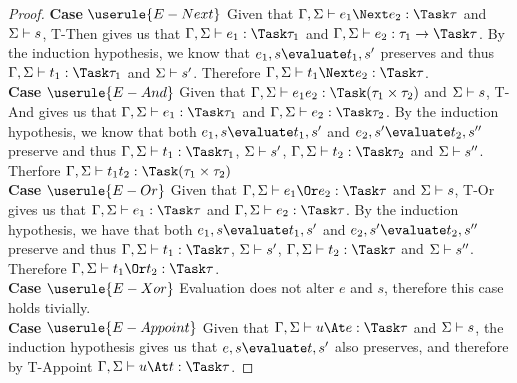 \begin{proof}
  \noindent\textbf{Case} $\userule{E-Next}$
      Given that $\Gamma,\Sigma\infers e_1\Next e_2:\Task \tau$ and $\Sigma\vdash s$, T-Then gives us that $\Gamma,\Sigma\infers e_1:\Task\tau_1$
      and $\Gamma,\Sigma\infers e_2:\tau_1 \to \Task \tau$. By the induction hypothesis, we know that
      $e_1,s\evaluate t_1,s'$ preserves and thus $\Gamma,\Sigma\infers t_1:\Task\tau_1$ and $\Sigma\vdash s'$. Therefore
      $\Gamma,\Sigma\infers t_1\Next e_2:\Task\tau$.\\

  \noindent\textbf{Case} $\userule{E-And}$
      Given that $\Gamma,\Sigma\infers e_1\And e_2:\Task(\tau_1\times\tau_2)$ and $\Sigma\vdash s$, T-And gives us that
      $\Gamma,\Sigma\infers e_1:\Task\tau_1$ and $\Gamma,\Sigma\infers e_2:\Task\tau_2$. By the induction hypothesis, we
      know that both $e_1,s\evaluate t_1,s'$ and $e_2,s'\evaluate t_2,s''$ preserve and thus
      $\Gamma,\Sigma\infers t_1:\Task\tau_1$, $\Sigma\vdash s'$, $\Gamma,\Sigma\infers t_2:\Task\tau_2$ and $\Sigma\vdash s''$. Therfore
      $\Gamma,\Sigma\infers t_1\And t_2:\Task(\tau_1\times\tau_2)$\\

  \noindent\textbf{Case} $\userule{E-Or}$
      Given that $\Gamma,\Sigma\infers e_1\Or e_2:\Task\tau$ and $\Sigma\vdash s$, T-Or gives us that $\Gamma,\Sigma\infers e_1:\Task\tau$ and
      $\Gamma,\Sigma\infers e_2:\Task\tau$. By the induction hypothesis, we have that both
      $e_1,s\evaluate t_1,s'$ and $e_2,s'\evaluate t_2,s''$ preserve and thus $\Gamma,\Sigma\infers t_1:\Task\tau$, $\Sigma\vdash s'$,
      $\Gamma,\Sigma\infers t_2:\Task\tau$ and $\Sigma\vdash s''$. Therefore $\Gamma,\Sigma\infers t_1\Or t_2:\Task\tau$.\\

  \noindent\textbf{Case} $\userule{E-Xor}$
      Evaluation does not alter $e$ and $s$, therefore this case holds tivially.\\

  \noindent\textbf{Case} $\userule{E-Appoint}$
      Given that $\Gamma,\Sigma\infers u \At e:\Task\tau$ and $\Sigma\vdash s$, the induction hypothesis gives us that $e,s\evaluate t,s'$ also preserves, and therefore by T-Appoint $\Gamma,\Sigma\infers u \At t:\Task\tau$.
\end{proof}



